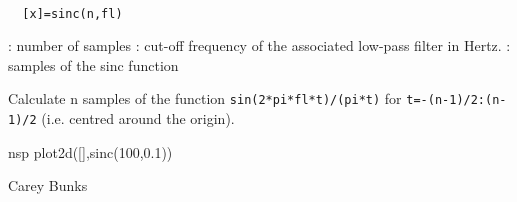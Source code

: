 
\begin{mandesc}
   \\ %
\end{mandesc}
\begin{calling_sequence}
\begin{verbatim}
  [x]=sinc(n,fl)  
\end{verbatim}
\end{calling_sequence}
\begin{parameters}
  \begin{varlist}
    : number of samples
    : cut-off frequency of the associated low-pass filter in Hertz.
    : samples of the sinc function
  \end{varlist}
\end{parameters}
\begin{mandescription}
  Calculate n samples of the function \verb!sin(2*pi*fl*t)/(pi*t)!
  for \verb!t=-(n-1)/2:(n-1)/2! (i.e. centred around the origin).
\end{mandescription}
\begin{examples}
  \begin{mintednsp}{nsp}
    plot2d([],sinc(100,0.1))
  \end{mintednsp}
\end{examples}
\begin{manseealso}
\end{manseealso}
\begin{authors}
  Carey Bunks
\end{authors}
